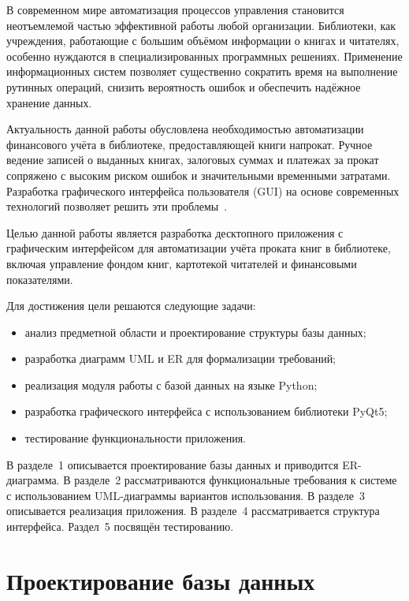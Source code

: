 \documentclass[14pt]{extreport}
\begin{document}
	
	
	
	\tableofcontents
	
	\intro
	
	В современном мире автоматизация процессов управления становится неотъемлемой частью эффективной работы любой организации. Библиотеки, как учреждения, работающие с большим объёмом информации о книгах и читателях, особенно нуждаются в специализированных программных решениях. Применение информационных систем позволяет существенно сократить время на выполнение рутинных операций, снизить вероятность ошибок и обеспечить надёжное хранение данных.
	
	Актуальность данной работы обусловлена необходимостью автоматизации финансового учёта в библиотеке, предоставляющей книги напрокат. Ручное ведение записей о выданных книгах, залоговых суммах и платежах за прокат сопряжено с высоким риском ошибок и значительными временными затратами. Разработка графического интерфейса пользователя (GUI) на основе современных технологий позволяет решить эти проблемы~\cite{bib1}.
	
	Целью данной работы является разработка десктопного приложения с графическим интерфейсом для автоматизации учёта проката книг в библиотеке, включая управление фондом книг, картотекой читателей и финансовыми показателями.
	
	Для достижения цели решаются следующие задачи:
	\begin{itemize}
		\item анализ предметной области и проектирование структуры базы данных;
		\item разработка диаграмм UML и ER для формализации требований;
		\item реализация модуля работы с базой данных на языке Python;
		\item разработка графического интерфейса с использованием библиотеки PyQt5;
		\item тестирование функциональности приложения.
	\end{itemize}
	
	В разделе~1 описывается проектирование базы данных и приводится ER-диаграмма. В разделе~2 рассматриваются функциональные требования к системе с использованием UML-диаграммы вариантов использования. В разделе~3 описывается реализация приложения. В разделе~4 рассматривается структура интерфейса. Раздел~5 посвящён тестированию.
	
	
	\chapter{Проектирование базы данных}
	
\end{document}
